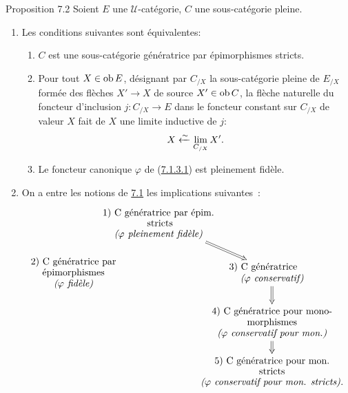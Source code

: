 \documentclass[10pt]{../fichiers-configuration-latex/smfart}
\def\labelenumi{(\theenumi)}
\def\labelenumii{(\theenumii)}
\begin{document}
\begin{enonce*}{Proposition 7.2}
Soient $E$ une $𝒰$-catégorie, $C$ une sous-catégorie pleine.
\begin{enumerate}
\renewcommand{\theenumi}{\roman{enumi}}
\renewcommand{\labelenumi}{(\theenumi)}
\item Les conditions suivantes sont équivalentes:
\begin{enumerate}
\renewcommand{\theenumii}{\alph{enumii}}
\renewcommand{\labelenumii}{\theenumii)}
\item $C$ est une sous-catégorie génératrice par épimorphismes
  stricts.

\item Pour tout $X\in \operatorname{ob} E$, désignant par $C_{/X}$ la
  sous-catégorie pleine de $E_{/X}$ formée des flèches
  $X'\rightarrow X$ de source $X'\in \operatorname{ob} C$, la flèche naturelle du
  foncteur d'inclusion $j:C_{/X}\rightarrow E$ dans le foncteur
  constant sur $C_{/X}$ de valeur $X$ fait de $X$ une limite inductive
  de $j$:
$$
X\xleftarrow{\sim} \lim_{C_{/X}}X'{}.
$$

\item Le foncteur canonique $\varphi$ de (\hyperref[I.sec7.1.3.1]{7.1.3.1}) est pleinement
  fidèle.
\end{enumerate}

\item On a entre les notions de \hyperref[I.def7.1]{7.1} les implications
suivantes~:
\[
\xymatrix@C=-.7cm@R=.45cm{
  &  \txt{{\rm 1)} C {%
génératrice par épim.}\\{ stricts}\\ \emph{($\varphi$
pleinement fidèle)}} \ar@{=>}[rd]&\\
 \txt{{\rm 2)} C %
génératrice par\\ épimorphismes\\ \emph{($\varphi$
 fidèle)}} &    &  \txt{{\rm 3)} C %
génératrice \phantom{aaa}\\
  \emph{($\varphi$ conservatif)}} \ar@{=>}[d]\\
    &      &  \txt{{\rm 4)} C %
génératrice pour mono-\\ morphismes \\
  \emph{($\varphi$ conservatif pour mon.)}}\ar@{=>}[d]\\
    &      &  \txt{{\rm 5)} C {%
génératrice pour mon.}\\ stricts\\
  \emph{($\varphi$ conservatif pour mon. stricts).}}\\
}
\]


\end{enumerate}
\end{enonce*}
\end{document}
